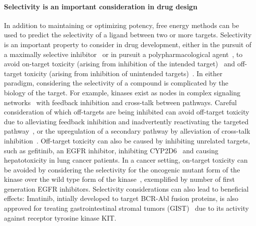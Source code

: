 \documentclass[9pt,lineno]{elife-modified} %
\begin{document}
\paragraph{Selectivity is an important consideration in drug design}
In addition to maintaining or optimizing potency, free energy methods can be used to predict the selectivity of a ligand between two or more targets. Selectivity is an important property to consider in drug development, either in the pursuit of a maximally selective inhibitor~\citep{Zhang2009-il,Huggins2012-hr} or in pursuit a polypharmacological agent~\citep{Fan2007-hm,Apsel2008-it,Knight:Nat.Rev.Cancer:2010,Hopkins2006-qu,Hopkins2008-ij}, to avoid on-target toxicity (arising from inhibition of the intended target)~\citep{Rudmann2013-hi}  and off-target toxicity (arising from inhibition of unintended targets)~\citep{Kijima2011-xs,Liu2014-yi}. In either paradigm, considering the selectivity of a compound is complicated by the biology of the target. For example, kinases exist as nodes in complex signaling networks~\citep{Mendoza2011-bj,Tricker2015-xx} with feedback inhibition and cross-talk between pathways. Careful consideration of which off-targets are being inhibited can avoid off-target toxicity due to alleviating feedback inhibition and inadvertently reactivating the targeted pathway~\citep{Mendoza2011-bj,Tricker2015-xx}, or the upregulation of a secondary pathway by alleviation of cross-talk inhibition~\citep{Bailey2014-pd,Chandarlapaty:CancerCell:2011}. Off-target toxicity can also be caused by inhibiting unrelated targets, such as gefitinib, an EGFR inhibitor, inhibiting CYP2D6~\citep{Kijima2011-xs} and causing hepatotoxicity in lung cancer patients. In a cancer setting, on-target toxicity can be avoided by considering the selectivity for the oncogenic mutant form of the kinase over the wild type form of the kinase~\citep{Pao2004-kx,Kim2012-mo,Juchum:DrugResist.Updat.:2015}, exemplified by number of first generation EGFR inhibitors. Selectivity considerations can also lead to beneficial effects: Imatinib, intially developed to target BCR-Abl fusion proteins, is also approved for treating gastrointestinal stromal tumors (GIST)~\citep{Din2008-ag} due to its activity against receptor tyrosine kinase KIT. 
\end{document}
